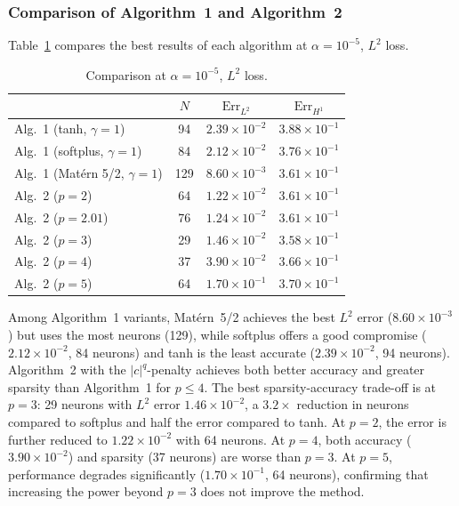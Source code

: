 \documentclass[12pt,fleqn]{amsart}
\theoremstyle{definition}
\begin{document}
\subsubsection*{Comparison of Algorithm~1 and Algorithm~2}

Table~\ref{tab:comparison} compares the best results of each algorithm at $\alpha = 10^{-5}$, $L^2$ loss.

\begin{table}[H]
\centering
\caption{Comparison at $\alpha = 10^{-5}$, $L^2$ loss.}
\label{tab:comparison}
\begin{tabular}{l|ccc}
\hline
 & $N$ & $\mathrm{Err}_{L^2}$ & $\mathrm{Err}_{H^1}$ \\
\hline
Alg.~1 (tanh, $\gamma = 1$) & 94 & $2.39 \times 10^{-2}$ & $3.88 \times 10^{-1}$ \\
Alg.~1 (softplus, $\gamma = 1$) & 84 & $2.12 \times 10^{-2}$ & $3.76 \times 10^{-1}$ \\
Alg.~1 (Mat\'ern 5/2, $\gamma = 1$) & 129 & $8.60 \times 10^{-3}$ & $3.61 \times 10^{-1}$ \\
Alg.~2 ($p = 2$) & 64 & $1.22 \times 10^{-2}$ & $3.61 \times 10^{-1}$ \\
Alg.~2 ($p = 2.01$) & 76 & $1.24 \times 10^{-2}$ & $3.61 \times 10^{-1}$ \\
Alg.~2 ($p = 3$) & 29 & $1.46 \times 10^{-2}$ & $3.58 \times 10^{-1}$ \\
Alg.~2 ($p = 4$) & 37 & $3.90 \times 10^{-2}$ & $3.66 \times 10^{-1}$ \\
Alg.~2 ($p = 5$) & 64 & $1.70 \times 10^{-1}$ & $3.70 \times 10^{-1}$ \\
\hline
\end{tabular}
\end{table}

Among Algorithm~1 variants, Mat\'ern~5/2 achieves the best $L^2$ error ($8.60 \times 10^{-3}$) but uses the most neurons (129), while softplus offers a good compromise ($2.12 \times 10^{-2}$, 84 neurons) and tanh is the least accurate ($2.39 \times 10^{-2}$, 94 neurons).
Algorithm~2 with the $|c|^q$-penalty achieves both better accuracy and greater sparsity than Algorithm~1 for $p \leqslant 4$.
The best sparsity-accuracy trade-off is at $p = 3$: 29 neurons with $L^2$ error $1.46 \times 10^{-2}$, a $3.2\times$ reduction in neurons compared to softplus and half the error compared to tanh.
At $p = 2$, the error is further reduced to $1.22 \times 10^{-2}$ with 64 neurons.
At $p = 4$, both accuracy ($3.90 \times 10^{-2}$) and sparsity (37 neurons) are worse than $p = 3$.
At $p = 5$, performance degrades significantly ($1.70 \times 10^{-1}$, 64 neurons), confirming that increasing the power beyond $p = 3$ does not improve the method.
\end{document}
